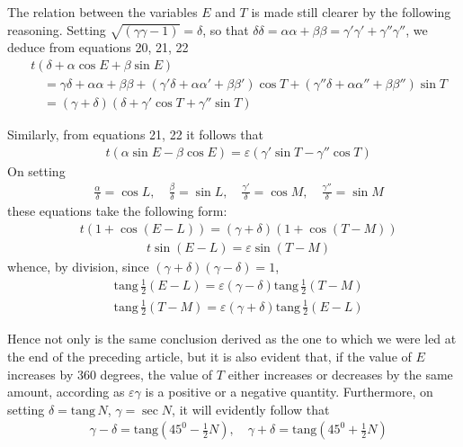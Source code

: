 
The relation between the variables $E$ and $T$ is made still clearer by the following reasoning. Setting $\surd{(\gamma\gamma-1)}=\delta$, so that $\delta\delta=\alpha\alpha+\beta\beta=\gamma'\gamma'+\gamma''\gamma''$, we deduce from equations 20, 21, 22
\[
\begin{aligned}
&t(\delta+\alpha\cos E+\beta\sin E)\\[8pt]
&\quad=\gamma\delta+\alpha\alpha+\beta\beta
+(\gamma'\delta+\alpha\alpha'+\beta\beta')\cos T
+(\gamma''\delta+\alpha\alpha''+\beta\beta'')\sin T\\[8pt]
&\quad=(\gamma+\delta)(\delta+\gamma'\cos T+\gamma''\sin T)
\end{aligned}
\]
\par Similarly, from equations 21, 22 it follows that
\[
\begin{aligned}
&t(\alpha\sin E-\beta\cos E)=\varepsilon(\gamma'\sin T-\gamma''\cos T)
\end{aligned}
\]
On setting
\[
\begin{aligned}
&\frac{\alpha}{\delta}=\cos L,\quad
\frac{\beta}{\delta}=\sin L,\quad
\frac{\gamma'}{\delta}=\cos M,\quad
\frac{\gamma''}{\delta}=\sin M
\end{aligned}
\]
these equations take the following form:
\[
\begin{aligned}
&t(1+\cos(E-L))=(\gamma+\delta)(1+\cos(T-M))
\end{aligned}
\]
\[
\begin{aligned}
&t\sin(E-L)=\varepsilon\sin(T-M)
\end{aligned}
\]
whence, by division, since $(\gamma+\delta)(\gamma-\delta)=1$,
\[
\begin{aligned}
&\mathrm{tang}\,\frac12(E-L)=\varepsilon(\gamma-\delta)\mathrm{tang}\,\frac12(T-M)
\end{aligned}
\]
\[
\begin{aligned}
&\mathrm{tang}\,\frac12(T-M)=\varepsilon(\gamma+\delta)\mathrm{tang}\,\frac12(E-L)
\end{aligned}
\]
\par Hence not only is the same conclusion derived as the one to which we were led at the end of the preceding article, but it is also evident that, if the value of $E$ increases by 360 degrees, the value of $T$ either increases or decreases by the same amount, according as $\varepsilon\gamma$ is a positive or a negative quantity. Furthermore, on setting $\delta=\mathrm{tang}\,N$, $\gamma=\sec N$, it will evidently follow that
\[
\begin{aligned}
&\gamma-\delta=\mathrm{tang}(45^0-\frac12N),\quad
\gamma+\delta=\mathrm{tang}(45^0+\frac12N)
\end{aligned}
\]
\clearpage
\endgroup
